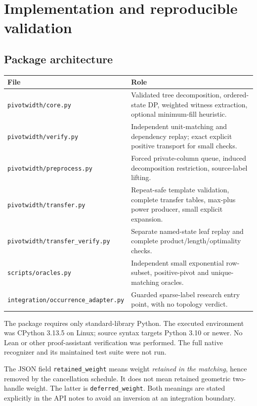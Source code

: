 \documentclass[11pt,a4paper]{article}
\theoremstyle{definition}
\theoremstyle{remark}
\newcommand{\code}[1]{\nolinkurl{#1}}
\begin{document}
\section{Implementation and reproducible validation}
\label{sec:implementation}

\subsection{Package architecture}
\begin{center}\small
\begin{tabular}{p{}p{}}
\toprule
File & Role \\
\midrule
\code{pivotwidth/core.py} & Validated tree decomposition, ordered-state DP, weighted witness extraction, optional minimum-fill heuristic. \\
\code{pivotwidth/verify.py} & Independent unit-matching and dependency replay; exact explicit positive transport for small checks. \\
\code{pivotwidth/preprocess.py} & Forced private-column queue, induced decomposition restriction, source-label lifting. \\
\code{pivotwidth/transfer.py} & Repeat-safe template validation, complete transfer tables, max-plus power producer, small explicit expansion. \\
\code{pivotwidth/transfer_verify.py} & Separate named-state leaf replay and complete product/length/optimality checks. \\
\code{scripts/oracles.py} & Independent small exponential row-subset, positive-pivot and unique-matching oracles. \\
\code{integration/occurrence_adapter.py} & Guarded sparse-label research entry point, with no topology verdict. \\
\bottomrule
\end{tabular}
\end{center}

The package requires only standard-library Python. The executed environment
was CPython 3.13.5 on Linux; source syntax targets Python 3.10 or newer.
No Lean or other proof-assistant verification was performed. The full
native recognizer and its maintained test suite were not run.

The JSON field \code{retained_weight} means weight \emph{retained in the
matching}, hence removed by the cancellation schedule. It does not mean
retained geometric two-handle weight. The latter is
\code{deferred_weight}. Both meanings are stated explicitly in the API
notes to avoid an inversion at an integration boundary.
\end{document}
